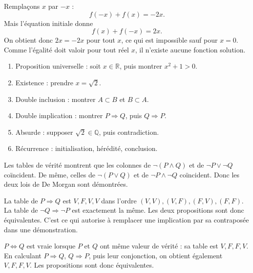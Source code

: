 \documentclass[11pt,a4paper]{article}
\newcommand{\Q}{\mathbb{Q}}
\newcommand{\R}{\mathbb{R}}
\newcommand{\non}{\neg}
\newcommand{\et}{\wedge}
\newcommand{\ou}{\vee}
\newcommand{\imp}{\Rightarrow}
\newcommand{\ssi}{\Longleftrightarrow}
\begin{document}
\begin{correctionbox}[METH 19]
Remplaçons \(x\) par \(-x\) :
\[
f(-x)+f(x)=-2x.
\]
Mais l'équation initiale donne
\[
f(x)+f(-x)=2x.
\]
On obtient donc \(2x=-2x\) pour tout \(x\), ce qui est impossible sauf pour \(x=0\). Comme l'égalité doit valoir pour tout réel \(x\), il n'existe aucune fonction solution.
\end{correctionbox}

\begin{correctionbox}[METH 20]
\begin{enumerate}[label=\alph*)]
    \item Proposition universelle : soit \(x\in\R\), puis montrer \(x^2+1>0\).
    \item Existence : prendre \(x=\sqrt2\).
    \item Double inclusion : montrer \(A\subset B\) et \(B\subset A\).
    \item Double implication : montrer \(P\imp Q\), puis \(Q\imp P\).
    \item Absurde : supposer \(\sqrt2\in\Q\), puis contradiction.
    \item Récurrence : initialisation, hérédité, conclusion.
\end{enumerate}
\end{correctionbox}

\begin{correctionbox}[DEM 21]
Les tables de vérité montrent que les colonnes de \(\non(P\et Q)\) et de \(\non P\ou\non Q\) coïncident. De même, celles de \(\non(P\ou Q)\) et de \(\non P\et\non Q\) coïncident. Donc les deux lois de De Morgan sont démontrées.
\end{correctionbox}

\begin{correctionbox}[DEM 22]
La table de \(P\imp Q\) est \(V,F,V,V\) dans l'ordre \((V,V),(V,F),(F,V),(F,F)\). La table de \(\non Q\imp\non P\) est exactement la même. Les deux propositions sont donc équivalentes. C'est ce qui autorise à remplacer une implication par sa contraposée dans une démonstration.
\end{correctionbox}

\begin{correctionbox}[DEM 23]
\(P\ssi Q\) est vraie lorsque \(P\) et \(Q\) ont même valeur de vérité : sa table est \(V,F,F,V\). En calculant \(P\imp Q\), \(Q\imp P\), puis leur conjonction, on obtient également \(V,F,F,V\). Les propositions sont donc équivalentes.
\end{correctionbox}
\end{document}
